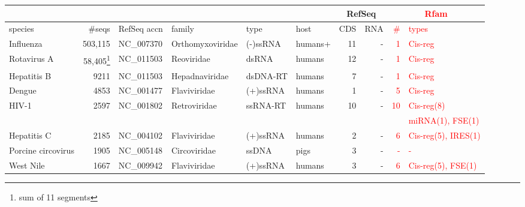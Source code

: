 
\begin{table}
\begin{center}
\begin{tabular}{|l|r|l|l|l|l||r|r||r|l||}
\multicolumn{6}{c}{}                                                                       & \multicolumn{2}{c}{\textbf{RefSeq}}               & \multicolumn{2}{c}{\textcolor{red}{\textbf{Rfam}}} \\ \hline
  species            &       \#seqs & RefSeq accn     & family         & type     & host   &   CDS & RNA    & \textcolor{red}{\#}       & \textcolor{red}{types} \\ \hline
  Influenza          &   503,115    & NC\_007370      &Orthomyxoviridae& (-)ssRNA & humans+&    11 & -      & \textcolor{red}{1}        & \textcolor{red}{Cis-reg} \\ 
  Rotavirus A        &58,405\footnote{sum of 11 segments}& NC\_011503&Reoviridae&dsRNA&humans&   12 & -      & \textcolor{red}{1}        & \textcolor{red}{Cis-reg}  \\ %
  Hepatitis B        &         9211 & NC\_011503      & Hepadnaviridae & dsDNA-RT & humans &     7 & -      & \textcolor{red}{1}        & \textcolor{red}{Cis-reg} \\ %
  Dengue             &         4853 & NC\_001477      & Flaviviridae   & (+)ssRNA & humans &     1 & -      & \textcolor{red}{5}        & \textcolor{red}{Cis-reg}  \\ 
  HIV-1              &        2597  & NC\_001802      & Retroviridae   & ssRNA-RT & humans &    10 & -      & \textcolor{red}{10}       & \textcolor{red}{Cis-reg(8)} \\
                     &              &                 &                &          &        &       &        &                           & \textcolor{red}{miRNA(1), FSE(1)} \\
  Hepatitis C        &        2185  & NC\_004102      & Flaviviridae   & (+)ssRNA & humans &     2 & -      & \textcolor{red}{6}        & \textcolor{red}{Cis-reg(5), IRES(1)} \\
  Porcine circovirus &        1905  & NC\_005148      & Circoviridae   & ssDNA    & pigs   &     3 & -      & \textcolor{red}{-}        & \textcolor{red}{-} \\
  West Nile          &        1667  & NC\_009942      & Flaviviridae   & (+)ssRNA & humans &     3 & -      & \textcolor{red}{6}        & \textcolor{red}{Cis-reg(5), FSE(1)} \\

\end{tabular}
\end{center}
\end{table}
